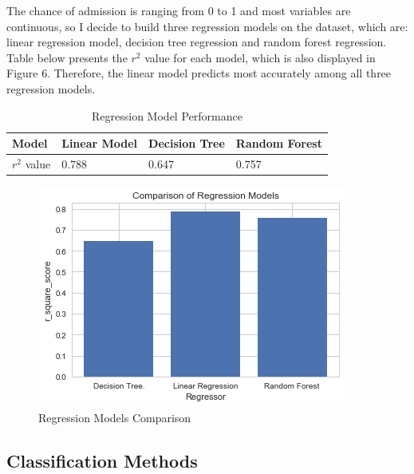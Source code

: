 \documentclass[12pt]{article}
\begin{document}
\begin{sloppypar}
The chance of admission is ranging from 0 to 1 and most variables are continuous, so I decide to build three regression models on the dataset, which are: linear regression model, decision tree regression and random forest regression. Table below presents the $r^2$ value for each model, which is also displayed in Figure 6. Therefore, the linear model predicts most accurately among all three regression models. 

\begin{table}[H]
\centering
\begin{tabular}{|l|l|l|l|}
\hline
Model & Linear Model & Decision Tree & Random Forest \\ \hline
$r^2$ value   & 0.788        & 0.647         & 0.757 \\ \hline
\end{tabular}
\caption{Regression Model Performance}
\end{table}

\begin{figure}[H]
    \centering
    \includegraphics[scale = 0.8]{regression_comparision.png}
    \caption{Regression Models Comparison}
\end{figure}

\subsection{Classification Methods}


\end{sloppypar}
\end{document}
